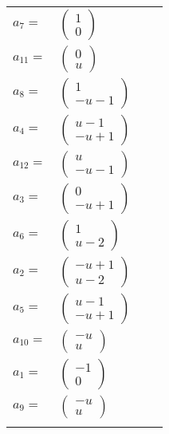 \documentclass[1p]{elsarticle_modified}
\theoremstyle{definition}
\begin{document}
\begin{tabular}{m{7pt} m{180pt} m{7pt} m{180pt} }
\flushright $a_{7}=$&$\begin{pmatrix}1\\0\end{pmatrix}$ \\
\flushright $a_{11}=$&$\begin{pmatrix}0\\u\end{pmatrix}$ \\
\flushright $a_{8}=$&$\begin{pmatrix}1\\- u-1\end{pmatrix}$ \\
\flushright $a_{4}=$&$\begin{pmatrix}u-1\\- u+1\end{pmatrix}$ \\
\flushright $a_{12}=$&$\begin{pmatrix}u\\- u-1\end{pmatrix}$ \\
\flushright $a_{3}=$&$\begin{pmatrix}0\\- u+1\end{pmatrix}$ \\
\flushright $a_{6}=$&$\begin{pmatrix}1\\u-2\end{pmatrix}$ \\
\flushright $a_{2}=$&$\begin{pmatrix}- u+1\\u-2\end{pmatrix}$ \\
\flushright $a_{5}=$&$\begin{pmatrix}u-1\\- u+1\end{pmatrix}$ \\
\flushright $a_{10}=$&$\begin{pmatrix}- u\\u\end{pmatrix}$ \\
\flushright $a_{1}=$&$\begin{pmatrix}-1\\0\end{pmatrix}$ \\
\flushright $a_{9}=$&$\begin{pmatrix}- u\\u\end{pmatrix}$\\&\end{tabular}
\end{document}
